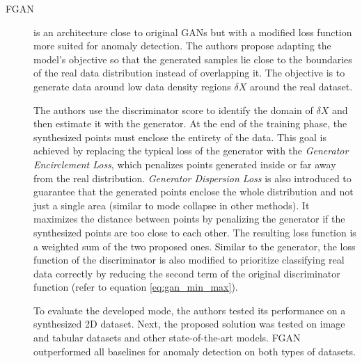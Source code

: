 \begin{description}
    \item[FGAN \cite{ngo.etal_FenceGANBetter_2019}] is an architecture close to original GANs but with a modified loss function more suited for anomaly detection. The authors propose adapting the model's objective so that the generated samples lie close to the boundaries of the real data distribution instead of overlapping it. The objective is to generate data around low data density regions $\delta X$ around the real dataset.

    The authors use the discriminator score to identify the domain of $\delta X$ and then estimate it with the generator. At the end of the training phase, the synthesized points must enclose the entirety of the data. This goal is achieved by replacing the typical loss of the generator with the \textit{Generator Encirclement Loss}, which penalizes points generated inside or far away from the real distribution. \textit{Generator Dispersion Loss} is also introduced to guarantee that the generated points enclose the whole distribution and not just a single area (similar to mode collapse in other methods). It maximizes the distance between points by penalizing the generator if the synthesized points are too close to each other. The resulting loss function is a weighted sum of the two proposed ones. Similar to the generator, the loss function of the discriminator is also modified to prioritize classifying real data correctly by reducing the second term of the original discriminator function (refer to equation \ref{eq:gan_min_max}).

    To evaluate the developed mode, the authors tested its performance on a synthesized 2D dataset. Next, the proposed solution was tested on image and tabular datasets and other state-of-the-art models. FGAN outperformed all baselines for anomaly detection on both types of datasets.
\end{description}

